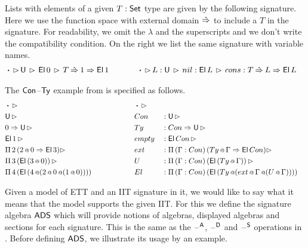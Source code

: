\documentclass[a4paper,UKenglish,cleveref, autoref]{lipics-v2019}
\begin{document}
\begin{example}
  Lists with elements of a given $T : \mathsf{Set}$ type are given by the
  following signature. Here we use the function space with external
  domain $\mathbin{\hat{\Rightarrow}}$ to include a $T$ in the signature. For readability, we
  omit the $\lambda$ and the superscripts and we don't write the
  compatibility condition. On the right we list the same signature
  with variable names.
  \begin{alignat*}{10}
    & \boldsymbol{\cdot}\,\ext\,\U\,\ext\,\El\,0\,\ext\,T\Ram 1\Ra \El\,1 \hspace{3.56em} \boldsymbol{\cdot}\,\ext\,L:\U\,\ext\,nil : \El\,L\,\ext\,cons : T\Ram L\Ra \El\,L
  \end{alignat*}
 
  The $\mathsf{Con}$--$\mathsf{Ty}$ example from  is specified as
  follows.
  \begin{alignat*}{5}
    & \boldsymbol{\cdot} \,\rhd                                                 && \boldsymbol{\cdot} \,\rhd                                                                \\
    & \mathsf{U}\,\rhd                                                                  && Con && : \mathsf{U}\,\rhd                                                                        \\
    & 0\Rightarrow\mathsf{U}\,\rhd                                                              && Ty && : Con\Rightarrow\mathsf{U}\,\rhd                                                                   \\
    & \mathsf{El}\,1\,\rhd                                                              && empty && : \mathsf{El}\,Con\,\rhd                                                                \\
    & \Pi\,2\,(2\mathop{{\scriptstyle @}} 0 \Rightarrow \mathsf{El}\,3)\rhd                                       && ext && : \Pi\,(\Gamma : Con)\,(Ty\mathop{{\scriptstyle @}}\Gamma \Rightarrow \mathsf{El}\,Con)\rhd                         \\
    & \Pi\,3\,(\mathsf{El}\,(3\mathop{{\scriptstyle @}} 0))\,\rhd                                         && U && : \Pi\,(\Gamma:Con)\,(\mathsf{El}\,(Ty\mathop{{\scriptstyle @}}\Gamma))\,\rhd                                 \\
    & \Pi\,4\,(\mathsf{El}\,(4\mathop{{\scriptstyle @}}(2\mathop{{\scriptstyle @}} 0\mathop{{\scriptstyle @}} (1\mathop{{\scriptstyle @}} 0)))) \hspace{4.79em} && El && : \Pi\,(\Gamma : Con)\,(\mathsf{El}\,(Ty\mathop{{\scriptstyle @}}(ext\mathop{{\scriptstyle @}}\Gamma\mathop{{\scriptstyle @}} (U\mathop{{\scriptstyle @}}\Gamma))))
  \end{alignat*}
\end{example}

Given a model of ETT and an IIT signature in it, we would like to say
what it means that the model supports the given IIT. For this we
define the signature algebra $\mathsf{ADS}$ which will provide notions of
algebras, displayed algebras and sections for each signature. This is
the same as the $\mathord{\hspace{1pt}\text{--}\hspace{1pt}}^{\mathsf{A}}$, $\mathord{\hspace{1pt}\text{--}\hspace{1pt}}^{\mathsf{D}}$ and $\mathord{\hspace{1pt}\text{--}\hspace{1pt}}^{\mathsf{S}}$ operations in
\cite{Kaposi:2019:CQI:3302515.3290315}. Before defining $\mathsf{ADS}$, we
illustrate its usage by an example.
\end{document}

